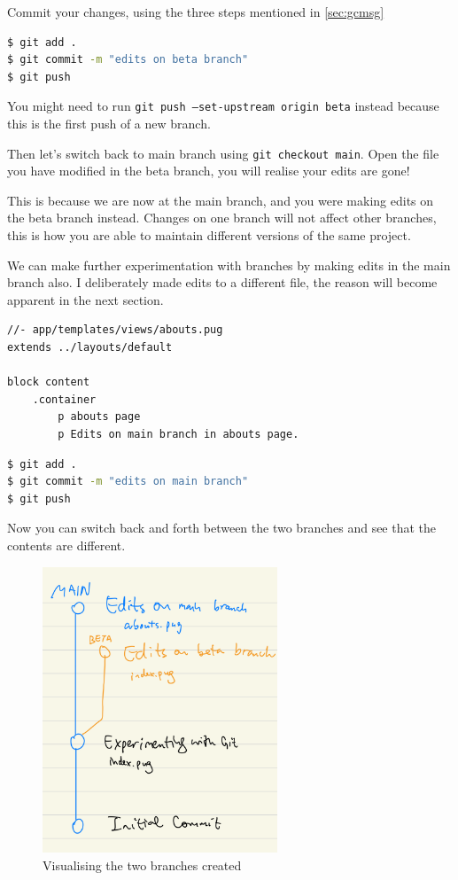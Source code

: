 Commit your changes, using the three steps mentioned in \cref{sec:gcmsg}

\begin{lstlisting}[language=bash]
$ git add .
$ git commit -m "edits on beta branch"
$ git push
\end{lstlisting}

You might need to run \texttt{git push --set-upstream origin beta} instead because this is the first push of a new branch. 

Then let's switch back to main branch using \texttt{git checkout main}. Open the file you have modified in the beta branch, you will realise your edits are gone!

This is because we are now at the main branch, and you were making edits on the beta branch instead. Changes on one branch will not affect other branches, this is how you are able to maintain different versions of the same project.

We can make further experimentation with branches by making edits in the main branch also. I deliberately made edits to a different file, the reason will become apparent in the next section.

\begin{lstlisting}[language=pug]
//- app/templates/views/abouts.pug
extends ../layouts/default

block content
	.container
		p abouts page
		p Edits on main branch in abouts page.
\end{lstlisting}

\begin{lstlisting}[language=bash]
$ git add .
$ git commit -m "edits on main branch"
$ git push
\end{lstlisting}

Now you can switch back and forth between the two branches and see that the contents are different.

\begin{figure}[h]
\centering
\includegraphics[width=7cm]{images/ch8-branching.png}
\caption{Visualising the two branches created}
\end{figure}

